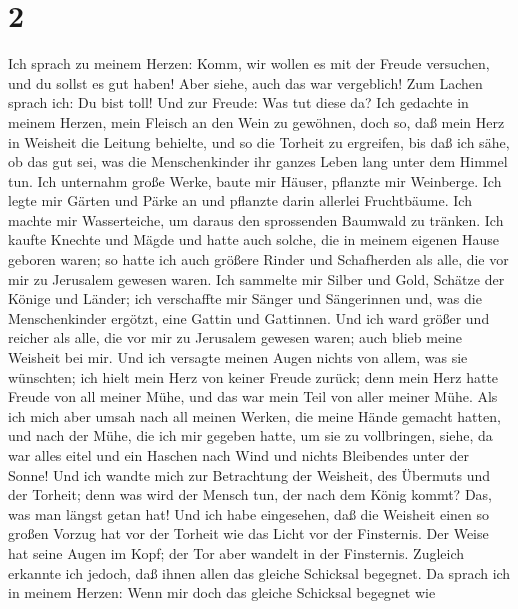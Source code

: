 \hypertarget{section-1}{%
\section{2}\label{section-1}}

 Ich sprach zu meinem Herzen: Komm, wir wollen es mit der
Freude versuchen, und du sollst es gut haben! Aber siehe, auch das war
vergeblich!  Zum Lachen sprach ich: Du bist toll! Und zur
Freude: Was tut diese da?  Ich gedachte in meinem Herzen,
mein Fleisch an den Wein zu gewöhnen, doch so, daß mein Herz in Weisheit
die Leitung behielte, und so die Torheit zu ergreifen, bis daß ich sähe,
ob das gut sei, was die Menschenkinder ihr ganzes Leben lang unter dem
Himmel tun.  Ich unternahm große Werke, baute mir Häuser,
pflanzte mir Weinberge.  Ich legte mir Gärten und Pärke an
und pflanzte darin allerlei Fruchtbäume.  Ich machte mir
Wasserteiche, um daraus den sprossenden Baumwald zu tränken.
 Ich kaufte Knechte und Mägde und hatte auch solche, die
in meinem eigenen Hause geboren waren; so hatte ich auch größere Rinder
und Schafherden als alle, die vor mir zu Jerusalem gewesen waren.
 Ich sammelte mir Silber und Gold, Schätze der Könige und
Länder; ich verschaffte mir Sänger und Sängerinnen und, was die
Menschenkinder ergötzt, eine Gattin und Gattinnen.  Und
ich ward größer und reicher als alle, die vor mir zu Jerusalem gewesen
waren; auch blieb meine Weisheit bei mir.  Und ich
versagte meinen Augen nichts von allem, was sie wünschten; ich hielt
mein Herz von keiner Freude zurück; denn mein Herz hatte Freude von all
meiner Mühe, und das war mein Teil von aller meiner Mühe.
 Als ich mich aber umsah nach all meinen Werken, die
meine Hände gemacht hatten, und nach der Mühe, die ich mir gegeben
hatte, um sie zu vollbringen, siehe, da war alles eitel und ein Haschen
nach Wind und nichts Bleibendes unter der Sonne!  Und ich
wandte mich zur Betrachtung der Weisheit, des Übermuts und der Torheit;
denn was wird der Mensch tun, der nach dem König kommt? Das, was man
längst getan hat!  Und ich habe eingesehen, daß die
Weisheit einen so großen Vorzug hat vor der Torheit wie das Licht vor
der Finsternis.  Der Weise hat seine Augen im Kopf; der
Tor aber wandelt in der Finsternis. Zugleich erkannte ich jedoch, daß
ihnen allen das gleiche Schicksal begegnet.  Da sprach
ich in meinem Herzen: Wenn mir doch das gleiche Schicksal begegnet wie
